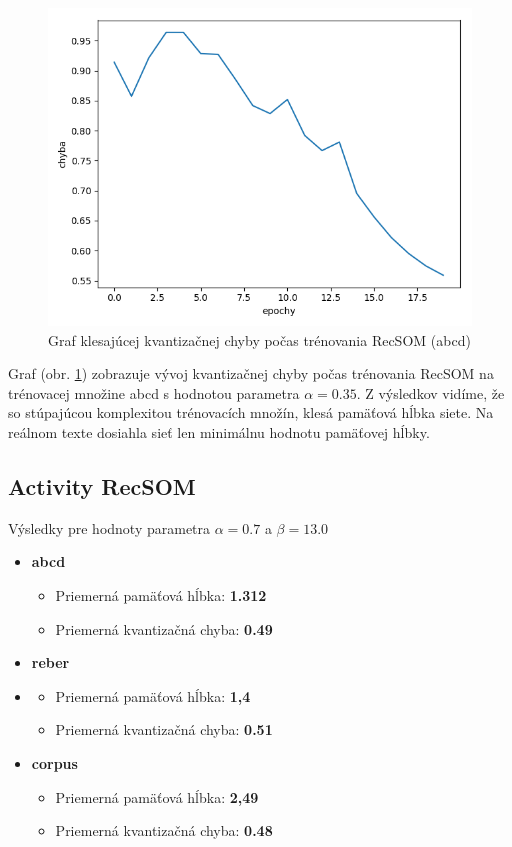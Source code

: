 \begin{figure}[H]
    \centering
    \includegraphics[width=\textwidth]{assets/r_error_top}
    \caption{Graf klesajúcej kvantizačnej chyby počas trénovania RecSOM (abcd)}
    \label{kvantizacna_chyba_recsom}

\end{figure}

Graf (obr. \ref{kvantizacna_chyba_recsom}) zobrazuje vývoj kvantizačnej chyby počas trénovania RecSOM
na trénovacej množine abcd s hodnotou parametra $\alpha = 0.35$.
Z výsledkov vidíme, že so stúpajúcou komplexitou trénovacích množín, klesá pamäťová hĺbka siete.
Na reálnom texte dosiahla sieť len minimálnu hodnotu pamäťovej hĺbky.

\subsection{Activity RecSOM}
Výsledky pre hodnoty parametra $\alpha = 0.7$ a $\beta = 13.0$
\begin{itemize}
    \item \textbf{abcd}
    \begin{itemize}
        \item Priemerná pamäťová hĺbka: \textbf{1.312}
        \item Priemerná kvantizačná chyba: \textbf{0.49}
    \end{itemize}
    \item \textbf{reber}
    \item \begin{itemize}
        \item Priemerná pamäťová hĺbka: \textbf{1,4}
        \item Priemerná kvantizačná chyba: \textbf{0.51}
    \end{itemize}
    \item \textbf{corpus}
    \begin{itemize}
        \item Priemerná pamäťová hĺbka: \textbf{2,49}
        \item Priemerná kvantizačná chyba: \textbf{0.48}
    \end{itemize}
\end{itemize}

